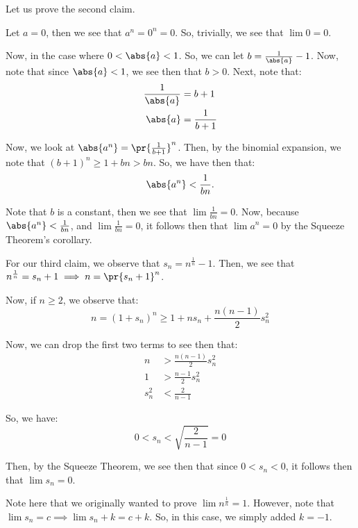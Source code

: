 \documentclass[openany]{book}
\begin{document}
\begin{example}
	Let us prove the second claim.
	
	Let $a = 0$, then we see that $a^{n} = 0^{n} = 0$. So, trivially, we see that $\lim 0 = 0$.
	
	Now, in the case where $0 < \abs{a} < 1$. So, we can let $b = \frac{1}{\abs{a}} - 1$. Now, note that since $\abs{a} < 1$, we see then that $b > 0$. Next, note that:
	\begin{align*}
		\frac 1 {\abs{a}} &= b + 1 \\
		\abs{a} &= \frac 1 {b+1}
	\end{align*}
	
	Now, we look at $\abs{a^{n}} = \pr{\frac{1}{b+1}}^{n}$. Then, by the binomial expansion, we note that $(b+1)^{n} \geq 1 + bn > bn$. So, we have then that:
	\begin{align*}
		\abs{a^{n}} < \frac{1}{bn}.
	\end{align*}
	
	Note that $b$ is a constant, then we see that $\lim \frac{1}{bn} = 0$. Now, because $\abs{a^{n}} < \frac{1}{bn}$, and $\lim \frac{1}{bn} = 0$, it follows then that $\lim a^{n} = 0$ by the Squeeze Theorem's corollary.
\end{example}

\begin{example}
	For our third claim, we observe that $s_n = n^{\frac{1}{n}} - 1$. Then, we see that $n^{\frac{1}{n}} = s_n + 1 \implies n = \pr{s_n + 1}^{n}$.
	
	Now, if $n \geq 2$, we observe that:
	\begin{equation*}
		n = (1+s_n)^{n} \geq 1 + ns_n + \frac{n(n-1)}{2}s_n^{2}
	\end{equation*}
	
	Now, we can drop the first two terms to see then that:
	\begin{align*}
		n &> \frac{n(n-1)}{2}s_n^{2} \\
		1 &> \frac{n-1}{2}s_n^{2} \\
		s_n^{2} &< \frac{2}{n-1}
	\end{align*}
	
	So, we have:
	\begin{equation*}
		0 < s_n < \sqrt{\frac{2}{n-1}} = 0
	\end{equation*}
	
	Then, by the Squeeze Theorem, we see then that since $0 < s_n < 0$, it follows then that $\lim s_n = 0$.
\end{example}
\begin{rmk}
	Note here that we originally wanted to prove $\lim n^{\frac{1}{n}} = 1$. However, note that $\lim s_n = c \implies \lim s_n + k = c + k$. So, in this case, we simply added $k = -1$.
\end{rmk}
\end{document}
